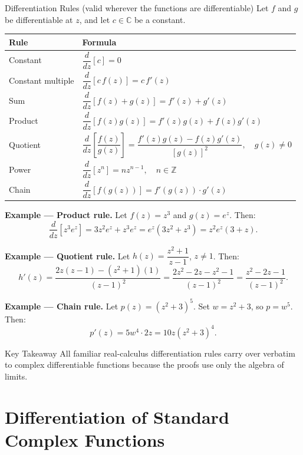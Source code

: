 \documentclass[12pt,a4paper]{article}
\begin{document}
\begin{infobox}{Differentiation Rules (valid wherever the functions are differentiable)}
Let $f$ and $g$ be differentiable at $z$, and let $c \in \mathbb{C}$ be a constant.

\medskip
\begin{tabular}{@{}ll@{}}
\toprule
\textbf{Rule} & \textbf{Formula} \\
\midrule
Constant & $\dfrac{d}{dz}[c] = 0$ \\[8pt]
Constant multiple & $\dfrac{d}{dz}[c\,f(z)] = c\,f'(z)$ \\[8pt]
Sum & $\dfrac{d}{dz}[f(z)+g(z)] = f'(z)+g'(z)$ \\[8pt]
Product & $\dfrac{d}{dz}[f(z)g(z)] = f'(z)g(z)+f(z)g'(z)$ \\[8pt]
Quotient & $\dfrac{d}{dz}\!\left[\dfrac{f(z)}{g(z)}\right]
           = \dfrac{f'(z)g(z)-f(z)g'(z)}{[g(z)]^2},\quad g(z)\neq 0$ \\[10pt]
Power & $\dfrac{d}{dz}[z^n] = n z^{n-1},\quad n\in\mathbb{Z}$ \\[8pt]
Chain & $\dfrac{d}{dz}[f(g(z))] = f'(g(z))\cdot g'(z)$ \\
\bottomrule
\end{tabular}
\end{infobox}

\medskip\noindent\textbf{Example --- Product rule.}
Let $f(z) = z^3$ and $g(z) = e^z$. Then:
\[
  \frac{d}{dz}[z^3 e^z] = 3z^2 e^z + z^3 e^z = e^z(3z^2 + z^3) = z^2 e^z(3+z).
\]

\medskip\noindent\textbf{Example --- Quotient rule.}
Let $h(z) = \dfrac{z^2+1}{z-1}$, $z \neq 1$. Then:
\[
  h'(z) = \frac{2z(z-1) - (z^2+1)(1)}{(z-1)^2}
         = \frac{2z^2 - 2z - z^2 - 1}{(z-1)^2}
         = \frac{z^2 - 2z - 1}{(z-1)^2}.
\]

\medskip\noindent\textbf{Example --- Chain rule.}
Let $p(z) = (z^2+3)^5$. Set $w = z^2+3$, so $p = w^5$. Then:
\[
  p'(z) = 5w^4 \cdot 2z = 10z(z^2+3)^4.
\]

\begin{learnbox}{Key Takeaway}
All familiar real-calculus differentiation rules carry over verbatim to complex
differentiable functions because the proofs use only the algebra of limits.
\end{learnbox}

\section{Differentiation of Standard Complex Functions}
\end{document}

